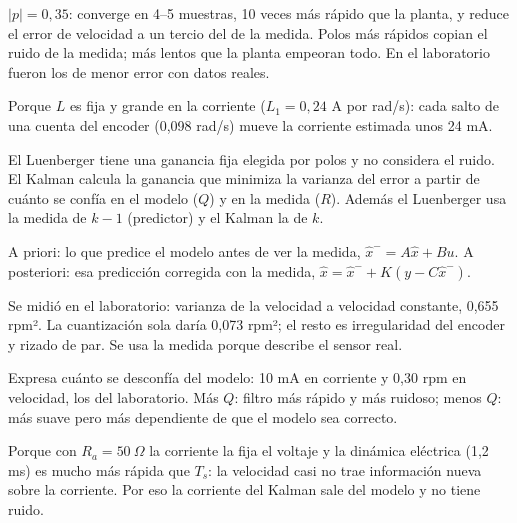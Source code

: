\documentclass[11pt]{article}
\begin{document}
\begin{preg}
$|p|=0{,}35$: converge en 4--5 muestras, 10 veces más rápido que la planta, y reduce el error de velocidad a un tercio del de la medida. Polos más rápidos copian el ruido de la medida; más lentos que la planta empeoran todo. En el laboratorio fueron los de menor error con datos reales.
\end{preg}

\begin{preg}
Porque $L$ es fija y grande en la corriente ($L_1=0{,}24$ A por rad/s): cada salto de una cuenta del encoder (0,098 rad/s) mueve la corriente estimada unos 24 mA.
\end{preg}

\begin{preg}
El Luenberger tiene una ganancia fija elegida por polos y no considera el ruido. El Kalman calcula la ganancia que minimiza la varianza del error a partir de cuánto se confía en el modelo ($Q$) y en la medida ($R$). Además el Luenberger usa la medida de $k-1$ (predictor) y el Kalman la de $k$.
\end{preg}

\begin{preg}
A priori: lo que predice el modelo antes de ver la medida, $\hat x^-=A\hat x+Bu$. A posteriori: esa predicción corregida con la medida, $\hat x=\hat x^-+K(y-C\hat x^-)$.
\end{preg}

\begin{preg}
Se midió en el laboratorio: varianza de la velocidad a velocidad constante, 0,655 rpm². La cuantización sola daría 0,073 rpm²; el resto es irregularidad del encoder y rizado de par. Se usa la medida porque describe el sensor real.
\end{preg}

\begin{preg}[12. ¿Y Q?]
Expresa cuánto se desconfía del modelo: 10 mA en corriente y 0,30 rpm en velocidad, los del laboratorio. Más $Q$: filtro más rápido y más ruidoso; menos $Q$: más suave pero más dependiente de que el modelo sea correcto.
\end{preg}

\begin{preg}
Porque con $R_a=50~\Omega$ la corriente la fija el voltaje y la dinámica eléctrica (1,2 ms) es mucho más rápida que $T_s$: la velocidad casi no trae información nueva sobre la corriente. Por eso la corriente del Kalman sale del modelo y no tiene ruido.
\end{preg}
\end{document}
